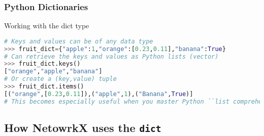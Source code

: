 \documentclass[xcolor=dvipsnames, 9pt]{beamer}
\begin{document}
\begin{frame}[fragile]
    \frametitle{Python Dictionaries}
    \begin{block}{Working with the dict type}
        \scriptsize{\begin{lstlisting}[language=Python]
# Keys and values can be of any data type
>>> fruit_dict={"apple":1,"orange":[0.23,0.11],"banana":True}
# Can retrieve the keys and values as Python lists (vector)
>>> fruit_dict.keys()
["orange","apple","banana"]
# Or create a (key,value) tuple
>>> fruit_dict.items()
[("orange",[0.23,0.11]),("apple",1),("Banana",True)]
# This becomes especially useful when you master Python ``list comprehension''
            \end{lstlisting}}
        \end{block}
\end{frame}


\subsection{How NetowrkX uses the \texttt{dict}} %
\label{sub:how_netowrkx_uses_the_dict}
\end{document}

